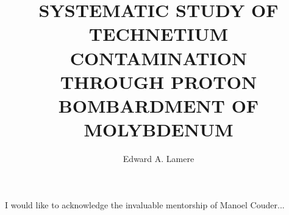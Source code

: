 \documentclass[final,numrefs,sort&compress, noinfo]{nddiss2e}
\begin{document}
\frontmatter %

\title{SYSTEMATIC STUDY OF TECHNETIUM CONTAMINATION \\ THROUGH PROTON BOMBARDMENT OF MOLYBDENUM }
\author{Edward A. Lamere}

\maketitle
%
%

\makecopyright

\begin{abstract}
\end{abstract}

\renewcommand{\dedicationname}{Dedication}
\begin{dedication}
\end{dedication}

\tableofcontents
\listoffigures
\listoftables


\begin{acknowledge}
  I would like to acknowledge the invaluable mentorship of Manoel Couder...
\end{acknowledge}
\end{document}
